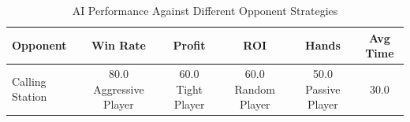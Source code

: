 \begin{table}[h]
\centering
\caption{AI Performance Against Different Opponent Strategies}
\label{tab:ai_performance}
\begin{tabular}{|l|c|c|c|c|c|}
\hline
\textbf{Opponent} & \textbf{Win Rate} & \textbf{Profit} & \textbf{ROI} & \textbf{Hands} & \textbf{Avg Time} \\
\hline
Calling Station & 80.0%
Aggressive Player & 60.0%
Tight Player & 60.0%
Random Player & 50.0%
Passive Player & 30.0%
\hline
\end{tabular}
\end{table}